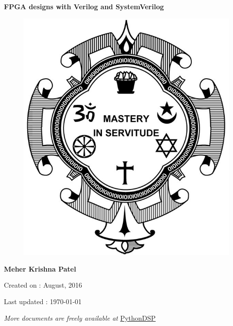 \begin{titlepage}	
	\centering
	
	\vspace*{40mm}
	\textbf{\Huge{FPGA designs with Verilog and SystemVerilog}}
	
	\vspace{0mm}
	\begin{figure}[!h]
		\centering
		\includegraphics[scale=0.3]{title-page/logo.jpg}
	\end{figure}
	
	\vspace{0mm} 
	\Large \textbf{{Meher Krishna Patel}}
	
	\small Created on : August, 2016
	
	\vspace*{0mm}
	\small  Last updated : \MonthYearFormat\today
	
	
	\vfill
	\small \textit{More documents are freely available at }{\href{http://pythondsp.readthedocs.io/en/latest/pythondsp/toc.html}{PythonDSP}}	
\end{titlepage}

